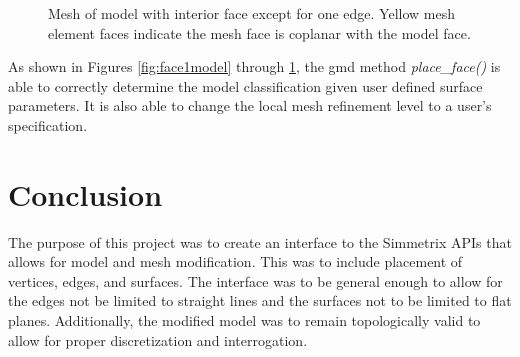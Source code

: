 \documentclass[a4paper, 12pt]{article}
\begin{document}
\begin{figure}[H]
  \centering
  \caption{Mesh of model with interior face except for one edge. 
        Yellow mesh element faces indicate the mesh face is 
        coplanar with the model face.}
  \label{fig:face3mesh}
\end{figure}

As shown in Figures \ref{fig:face1model} through \ref{fig:face3mesh}, 
the gmd method \emph{place\_face()} is able to correctly determine 
the model classification given user defined surface parameters. It is also 
able to change the local mesh refinement level to a user's specification. 

\section{Conclusion} \label{sec:conclusion}
The purpose of this project was to create an interface to the 
Simmetrix APIs that allows for model and mesh modification. This
was to include placement of vertices, edges, and surfaces. The 
interface was to be general enough to allow for the edges not be limited
to straight lines and the surfaces not to be limited to flat planes. 
Additionally, the modified model was to remain topologically valid
to allow for proper discretization and interrogation. 
\end{document}
